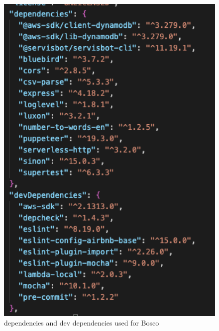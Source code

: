 \documentclass[12pt,a4paper,titlepage]{report}
\begin{document}
\begin{figure}[ht]
  \centering
  \includegraphics[width=15cm]{./diagrams/dependencies.png}
  \caption{dependencies and dev dependencies used for Bosco}
 \end{figure}

\printbibliography[title={References}]
\end{document}
